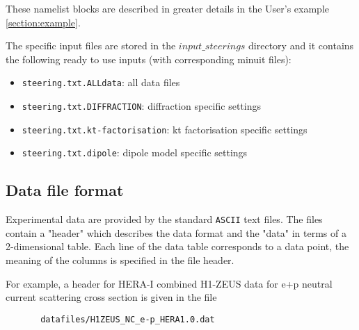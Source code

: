 These namelist blocks are described in greater details in the User's example \ref{section:example}. 

The specific input files are stored in the {\tt $input\_steerings$} directory and 
it contains the following ready to use inputs (with corresponding minuit files):

\begin{itemize}
\item  {\tt steering.txt.ALLdata}: all data files 
\item  {\tt steering.txt.DIFFRACTION}: diffraction specific settings 
\item  {\tt steering.txt.kt-factorisation}: kt factorisation specific settings
\item  {\tt steering.txt.dipole}: dipole model specific settings  
\end{itemize}


\subsection{Data file format}
\label{sec:dataformat}
   Experimental data are provided by the standard {\tt ASCII} text files. The files
   contain a "header" which describes the data format and the "data" in terms
   of a 2-dimensional table. Each line of the data table corresponds to a
   data point, the meaning of the columns is specified in the file header.

   For example, a header for HERA-I combined H1-ZEUS data for e+p neutral 
   current scattering cross section is given in the file

\begin{verbatim}
       datafiles/H1ZEUS_NC_e-p_HERA1.0.dat
\end{verbatim}

